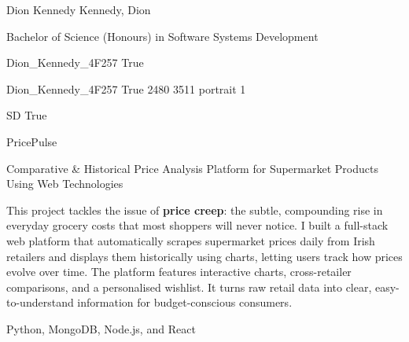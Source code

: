 \documentclass[twoside]{report}
\begin{document}
\begingroup{}\relax



\def\Key{Dion_Kennedy_4F257}

{Dion Kennedy}
{Kennedy, Dion}

{Bachelor of Science (Honours) in Software Systems Development}

{Dion_Kennedy_4F257}
{True}

{Dion_Kennedy_4F257}
{True}
{2480}
{3511}
{portrait}
{1}

{SD}
{True}

{PricePulse}

{Comparative \& Historical Price Analysis Platform for Supermarket Products Using Web Technologies}

{This project tackles the issue of {\bfseries price creep}: the subtle, compounding rise in everyday grocery costs that most shoppers will never notice. I built a full-stack web platform that automatically scrapes supermarket prices daily from Irish retailers and displays them historically using charts, letting users track how prices evolve over time. The platform features interactive charts, cross-retailer comparisons, and a personalised wishlist. It turns raw retail data into clear, easy-to-understand information for budget-conscious consumers.}

{Python, MongoDB, Node.js, and React}
\end{document}
